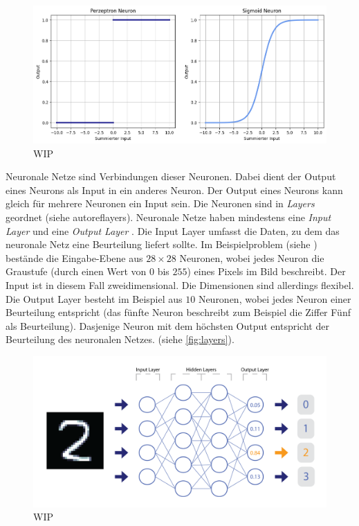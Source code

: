 \begin{figure}[!ht]
    \centering
    \includegraphics[width=\textwidth]{images/theorie/percep-v-sig.png}
    \caption{WIP}
    \label{fig:percep-v-sig}
\end{figure}

Neuronale Netze sind Verbindungen dieser Neuronen. Dabei dient der Output eines
Neurons als Input in ein anderes Neuron. Der Output eines Neurons kann gleich
für mehrere Neuronen ein Input sein. Die Neuronen sind in \emph{Layers} geordnet
(siehe autoref{layers}). Neuronale Netze haben mindestens eine \emph{Input
Layer} und eine \emph{Output Layer}
\cite{nielsen_neural_2015}\cite{ognjanovski_everything_2020}. Die Input Layer
umfasst die Daten, zu dem das neuronale Netz eine Beurteilung liefert sollte. Im
Beispielproblem (siehe ) bestände die Eingabe-Ebene aus
$28\times28$ Neuronen, wobei jedes Neuron die Graustufe (durch einen Wert von
$0$ bis $255$) eines Pixels im Bild beschreibt. Der Input ist in diesem Fall
zweidimensional. Die Dimensionen sind allerdings flexibel. Die Output Layer
besteht im Beispiel aus $10$ Neuronen, wobei jedes Neuron einer Beurteilung
entspricht (das fünfte Neuron beschreibt zum Beispiel die Ziffer Fünf als
Beurteilung). Dasjenige Neuron mit dem höchsten Output entspricht der
Beurteilung des neuronalen Netzes. (siehe \autoref{fig:layers}).

\begin{figure}[!ht]
    \centering
    \includegraphics[width=\textwidth]{images/theorie/layers.png}
    \caption{WIP}
    \label{fig:layers}
\end{figure}


